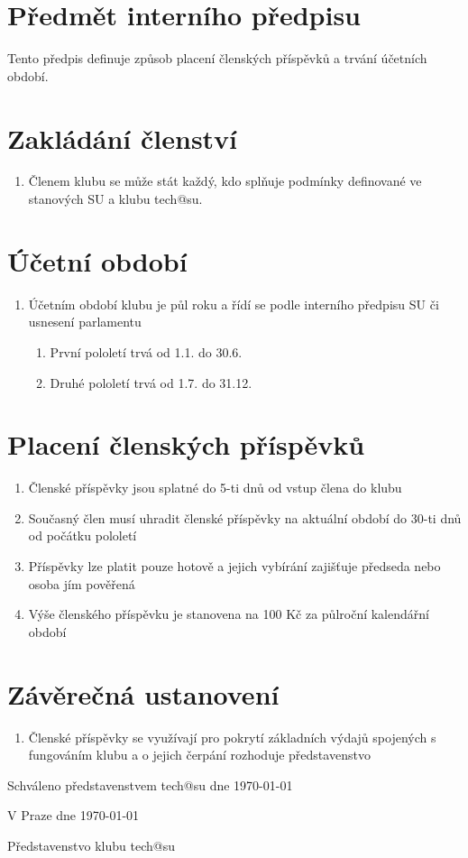 \documentclass[10pt]{article}
\begin{document}
\section{Předmět interního předpisu}
	Tento předpis definuje způsob placení členských příspěvků a trvání účetních období.

\section{Zakládání členství}
	\begin{enumerate}
		\item Členem klubu se může stát každý, kdo splňuje podmínky definované ve stanových SU a klubu tech@su.
	\end{enumerate}
\section{Účetní období}
	\begin{enumerate}
		\item Účetním období klubu je půl roku a řídí se podle interního předpisu SU či usnesení parlamentu
		\begin{enumerate}
			\item První pololetí trvá od 1.1. do 30.6.
			\item Druhé pololetí trvá od 1.7. do 31.12.
		\end{enumerate}
	\end{enumerate}
\section{Placení členských příspěvků}
	\begin{enumerate}
		\item Členské příspěvky jsou splatné do 5-ti dnů od vstup člena do klubu
		\item Současný člen musí uhradit členské příspěvky na aktuální období do 30-ti dnů od počátku pololetí
		\item Příspěvky lze platit pouze hotově a jejich vybírání zajišťuje předseda nebo osoba jím pověřená
		\item Výše členského příspěvku je stanovena na 100 Kč za půlroční kalendářní období
	\end{enumerate}
\section{Závěrečná ustanovení}
	\begin{enumerate}
		\item Členské příspěvky se využívají pro pokrytí základních výdajů spojených s fungováním klubu a o jejich čerpání rozhoduje představenstvo
	\end{enumerate}

	

\vspace{10mm}

Schváleno představenstvem tech@su dne \today

\vspace{30mm}

\hfill V Praze dne \today

\hfill Představenstvo klubu tech@su
\end{document}
